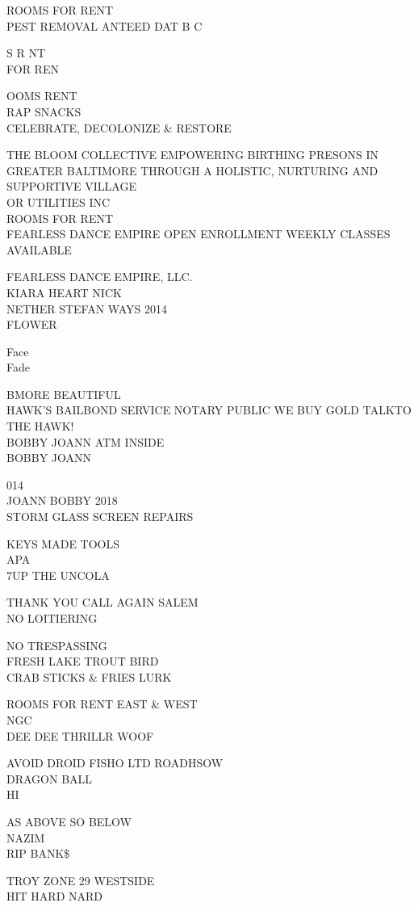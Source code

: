 \documentclass[10pt,letterpaper]{article}
\begin{document}
ROOMS FOR RENT\\
PEST REMOVAL ANTEED DAT B C

S R NT\\
FOR REN

OOMS RENT\\
RAP SNACKS\\
CELEBRATE, DECOLONIZE \& RESTORE

THE BLOOM COLLECTIVE EMPOWERING BIRTHING PRESONS IN GREATER BALTIMORE THROUGH A HOLISTIC, NURTURING AND SUPPORTIVE VILLAGE\\
OR UTILITIES INC\\
ROOMS FOR RENT\\
FEARLESS DANCE EMPIRE OPEN ENROLLMENT WEEKLY CLASSES AVAILABLE

FEARLESS DANCE EMPIRE, LLC.\\
KIARA HEART NICK\\
NETHER STEFAN WAYS 2014\\
FLOWER

Face\\
Fade

BMORE BEAUTIFUL\\
HAWK'S BAILBOND SERVICE NOTARY PUBLIC WE BUY GOLD TALKTO THE HAWK!\\
BOBBY JOANN ATM INSIDE\\
BOBBY JOANN

014\\
JOANN BOBBY 2018\\
STORM GLASS SCREEN REPAIRS

KEYS MADE TOOLS\\
APA\\
7UP THE UNCOLA

THANK YOU CALL AGAIN SALEM\\
NO LOITIERING

NO TRESPASSING\\
FRESH LAKE TROUT BIRD\\
CRAB STICKS \& FRIES LURK

ROOMS FOR RENT EAST \& WEST\\
NGC\\
DEE DEE THRILLR WOOF

AVOID DROID FISHO LTD ROADHSOW\\
DRAGON BALL\\
HI

AS ABOVE SO BELOW\\
NAZIM\\
RIP BANK\$

TROY ZONE 29 WESTSIDE\\
HIT HARD NARD
\end{document}
